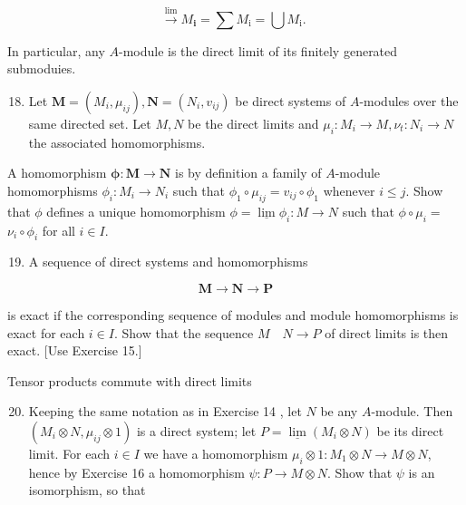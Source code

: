 \documentclass{standalone}
\theoremstyle{definition}
\theoremstyle{remark}
\begin{document}
\[
\stackrel{\lim }{\rightarrow} M_{\mathbf{i}}=\sum M_{\mathrm{i}}=\bigcup M_{\mathrm{i}} \text {. }
\]

In particular, any $A$-module is the direct limit of its finitely generated submoduies.

\begin{enumerate}
  \setcounter{enumi}{17}
  \item Let $\mathbf{M}=\left(M_{i}, \mu_{i j}\right), \mathbf{N}=\left(N_{i}, v_{i j}\right)$ be direct systems of $A$-modules over the same directed set. Let $M, N$ be the direct limits and $\mu_{i}: M_{i} \rightarrow M, \nu_{t}: N_{i} \rightarrow N$ the associated homomorphisms.
\end{enumerate}

A homomorphism $\boldsymbol{\phi}: \mathbf{M} \rightarrow \mathbf{N}$ is by definition a family of $A$-module homomorphisms $\phi_{i}: M_{i} \rightarrow N_{i}$ such that $\phi_{1} \circ \mu_{i j}=v_{i j} \circ \phi_{1}$ whenever $i \leqslant j$. Show that $\phi$ defines a unique homomorphism $\phi=\underline{\lim } \phi_{i}: M \rightarrow N$ such that $\phi \circ \mu_{i}=$ $\nu_{i} \circ \phi_{i}$ for all $i \in I$.

\begin{enumerate}
  \setcounter{enumi}{18}
  \item A sequence of direct systems and homomorphisms
\end{enumerate}

\[
\mathbf{M} \rightarrow \mathbf{N} \rightarrow \mathbf{P}
\]

is exact if the corresponding sequence of modules and module homomorphisms is exact for each $i \in I$. Show that the sequence $M \quad N \rightarrow P$ of direct limits is then exact. [Use Exercise 15.]

Tensor products commute with direct limits

\begin{enumerate}
  \setcounter{enumi}{19}
  \item Keeping the same notation as in Exercise 14 , let $N$ be any $A$-module. Then $\left(M_{i} \otimes N, \mu_{i j} \otimes 1\right)$ is a direct system; let $P=\underline{\lim }\left(M_{i} \otimes N\right)$ be its direct limit. For each $i \in I$ we have a homomorphism $\mu_{i} \otimes 1: M_{1} \otimes N \rightarrow M \otimes N$, hence by Exercise 16 a homomorphism $\psi: P \rightarrow M \otimes N$. Show that $\psi$ is an isomorphism, so that
\end{enumerate}
\end{document}
